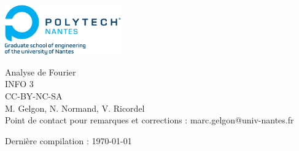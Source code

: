 \documentclass[12pt,a4paper]{report}
\theoremstyle{plain}
\theoremstyle{definition}
\theoremstyle{remark}
\begin{document}
\begin{titlepage}
\includegraphics[width=5cm]{logo-polytech.pdf}

\vfill 
{\huge Analyse de Fourier} \\

{\huge INFO 3} \\

\vfill
CC-BY-NC-SA  \\

M. Gelgon, N. Normand, V. Ricordel \\

Point de contact pour remarques et corrections : marc.gelgon@univ-nantes.fr

Dernière compilation : \today


\end{titlepage}

\tableofcontents







%  
\end{document}
